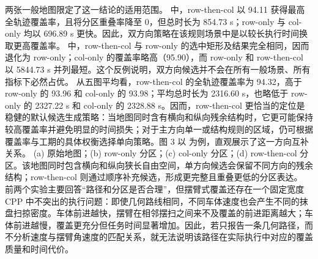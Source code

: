 {}两张一般地图限定了这一结论的适用范围。 中，row-then-col 以 94.11\markdownRendererPercentSign{} 获得最高全轨迹覆盖率，且将分区重叠率降至 0，但总时长为 854.73 s；row-only 与 col-only 均以 696.89 s 更快。因此，双方向策略在该规则场景中是以较长执行时间换取更高覆盖率。 中，row-then-col 与 row-only 的选中矩形及结果完全相同，因而退化为 row-only；col-only 的覆盖率略高（95.90\markdownRendererPercentSign{}），而 row-only 和 row-then-col 以 5844.73 s 并列最短。这个反例说明，双方向候选并不会在所有一般场景、所有指标下必然占优。\markdownRendererParagraphSeparator
{}从五图平均看，row-then-col 的全轨迹覆盖率为 94.32\markdownRendererPercentSign{}，高于 row-only 的 93.96\markdownRendererPercentSign{} 和 col-only 的 93.98\markdownRendererPercentSign{}；平均总时长为 2316.60 s，也略低于 row-only 的 2327.22 s 和 col-only 的 2328.88 s。因而，row-then-col 更恰当的定位是稳健的默认候选生成策略：当地图同时含有横向和纵向残余结构时，它更可能保持较高覆盖率并避免明显的时间损失；对于主方向单一或结构规则的区域，仍可根据覆盖率与工期的具体权衡选择单向策略。图 3 以  为例，直观展示了这一方向互补关系。\markdownRendererParagraphSeparator
{}\markdownRendererParagraphSeparator
{} (a) 原始地图；(b) row-only 分区；(c) col-only 分区；(d) row-then-col 分区。该地图同时包含横向和纵向狭长自由空间，单方向候选会保留不同方向的残余结构；row-then-col 则通过顺序补充候选，形成更完整且重叠更低的分区表达。\markdownRendererParagraphSeparator
{}
\markdownRendererSectionEnd \markdownRendererSectionBegin
{}\markdownRendererParagraphSeparator
{}前两个实验主要回答“路径和分区是否合理”，但摆臂式覆盖还存在一个固定宽度 CPP 中不突出的执行问题：即使几何路线相同，不同车体速度也会产生不同的抹盘扫掠密度。车体前进越快，摆臂在相邻摆扫之间来不及覆盖的前进距离越大；车体前进越慢，覆盖更充分但任务时间显著增加。因此，若只报告一条几何路径，而不分析速度与摆臂角速度的匹配关系，就无法说明该路径在实际执行中对应的覆盖质量和时间代价。\markdownRendererParagraphSeparator
